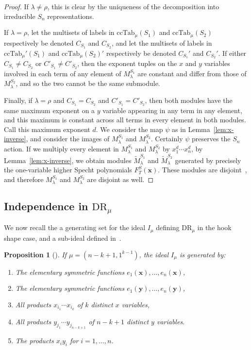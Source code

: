 \documentclass[11pt]{article}
\newtheorem{prop}[theo]{Proposition}
\theoremstyle{definition}
\numberwithin{equation}{section}
\newcommand{\ccind}{\mathrm{ccTab}}
\newcommand{\DR}{\mathrm{DR}}
\begin{document}
\begin{proof}
	If $\lambda\neq \rho$, this is clear by the uniqueness of the decomposition into irreducible $S_n$ representations.
	
	If $\lambda=\rho$, let the multisets of labels in $\ccind_\mu(S_1)$ and $\ccind_\mu(S_2)$ respectively be denoted $C_{S_1}$ and $C_{S_2}$, and let the multisets of labels in $\ccind_\mu'(S_1)$ and $\ccind_\mu(S_2)'$ respectively be denoted $C_{S_1}'$ and $C_{S_2}'$.  If either $C_{S_1} \neq C_{S_2}$ or $C'_{S_1} \neq C'_{S_2}$, then the exponent tuples on the $x$ and $y$ variables involved in each term of any element of $M_\lambda^{S_1}$ are constant and differ from those of $M_\lambda^{S_2}$, and so the two cannot be the same submodule.
	
	Finally, if $\lambda=\rho$ and $C_{S_1}=C_{S_2}$ and $C'_{S_1}=C'_{S_2}$, then both modules have the same maximum exponent on a $y$ variable appearing in any term in any element, and this maximum is constant across all terms in every element in both modules.  Call this maximum exponent $d$.  We consider the map $\psi$ as in Lemma~\ref{lem:x-inverse}, and consider the images of $M_\lambda^{S_1}$ and $M_{\lambda}^{S_2}$.  Certainly $\psi$ preserves the $S_n$ action. If we multiply every element in $M_\lambda^{S_1}$ and $M_{\lambda}^{S_2}$ by $x_1^d\cdots x_n^d$, by Lemma~\ref{lem:x-inverse}, we obtain modules $\widetilde{M}_{\lambda}^{S_1}$ and $\widetilde{M}_{\lambda}^{S_2}$ generated by precisely the one-variable higher Specht polynomials $F_T^S(\mathbf{x})$.  These modules are disjoint~\cite{ATY}, and therefore $M_\lambda^{S_1}$ and $M_\lambda^{S_2}$ are disjoint as well.
\end{proof}

\subsection{Independence in \texorpdfstring{$\DR_\mu$}{}}

We now recall the a generating set for the ideal $I_\mu$ defining $\DR_\mu$ in the hook shape case, and a sub-ideal defined in~\cite{HookBases}.

\begin{prop}[\cite{HookBases}] \label{prop:ideal}
	If $\mu=(n-k+1,1^{k-1})$, the ideal $I_\mu$ is generated by:
	\begin{enumerate}
		\item The elementary symmetric functions $e_1(\mathbf{x}),\ldots,e_n(\mathbf{x})$,
		\item The elementary symmetric functions 
		$e_1(\mathbf{y}),\ldots,e_n(\mathbf{y})$,
		\item All products $x_{i_1}\cdots x_{i_k}$ of $k$ distinct $x$ variables,
		\item All products $y_{j_1}\cdots y_{j_{n-k+1}}$ of $n-k+1$ distinct $y$ variables.
		\item The products $x_iy_i$ for $i=1,\ldots,n$.
	\end{enumerate}
\end{prop}
\end{document}
